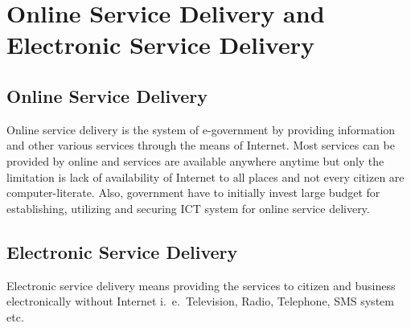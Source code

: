 \section{Online Service Delivery and Electronic Service Delivery}
\subsection{Online Service Delivery}
Online service delivery is the system of e-government by providing information and other various services through the means of Internet. Most services can be provided by online and services are available anywhere anytime but only the limitation is lack of availability of Internet to all places and not every citizen are computer-literate. Also, government have to initially invest large budget for establishing, utilizing and securing ICT system for online service delivery.


\subsection{Electronic Service Delivery}
Electronic service delivery means providing the services to citizen and business
electronically without Internet i.\ e.\ Television, Radio, Telephone, SMS system etc.



\newpage\thispagestyle{empty}








